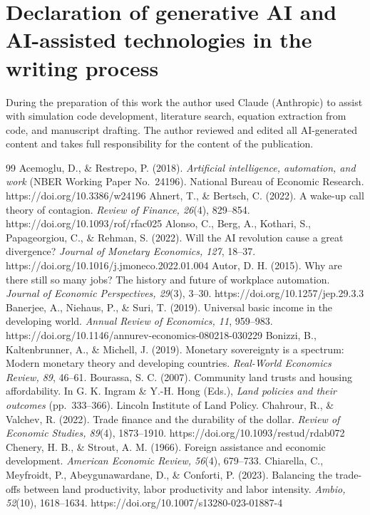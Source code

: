 \documentclass[preprint,review,12pt]{elsarticle}
\begin{document}
\section*{Declaration of generative AI and AI-assisted technologies in the writing process} During the preparation of this work the author used Claude (Anthropic) to assist with simulation code development, literature search, equation extraction from code, and manuscript drafting. The author reviewed and edited all AI-generated content and takes full responsibility for the content of the publication. 
\begin{thebibliography}{99} 
 Acemoglu, D., \& Restrepo, P. (2018). \emph{Artificial intelligence, automation, and work} (NBER Working Paper No.~24196). National Bureau of Economic Research. https://doi.org/10.3386/w24196 
 Ahnert, T., \& Bertsch, C. (2022). A wake-up call theory of contagion. \emph{Review of Finance, 26}(4), 829--854. https://doi.org/10.1093/rof/rfac025 
 Alonso, C., Berg, A., Kothari, S., Papageorgiou, C., \& Rehman, S. (2022). Will the AI revolution cause a great divergence? \emph{Journal of Monetary Economics, 127}, 18--37. https://doi.org/10.1016/j.jmoneco.2022.01.004 
 Autor, D. H. (2015). Why are there still so many jobs? The history and future of workplace automation. \emph{Journal of Economic Perspectives, 29}(3), 3--30. https://doi.org/10.1257/jep.29.3.3 
 Banerjee, A., Niehaus, P., \& Suri, T. (2019). Universal basic income in the developing world. \emph{Annual Review of Economics, 11}, 959--983. https://doi.org/10.1146/annurev-economics-080218-030229 
 Bonizzi, B., Kaltenbrunner, A., \& Michell, J. (2019). Monetary sovereignty is a spectrum: Modern monetary theory and developing countries. \emph{Real-World Economics Review, 89}, 46--61. 
 Bourassa, S. C. (2007). Community land trusts and housing affordability. In G. K. Ingram \& Y.-H. Hong (Eds.), \emph{Land policies and their outcomes} (pp.~333--366). Lincoln Institute of Land Policy. 
 Chahrour, R., \& Valchev, R. (2022). Trade finance and the durability of the dollar. \emph{Review of Economic Studies, 89}(4), 1873--1910. https://doi.org/10.1093/restud/rdab072 
 Chenery, H. B., \& Strout, A. M. (1966). Foreign assistance and economic development. \emph{American Economic Review, 56}(4), 679--733. 
 Chiarella, C., Meyfroidt, P., Abeygunawardane, D., \& Conforti, P. (2023). Balancing the trade-offs between land productivity, labor productivity and labor intensity. \emph{Ambio, 52}(10), 1618--1634. https://doi.org/10.1007/s13280-023-01887-4 

\end{thebibliography}
\end{document}
